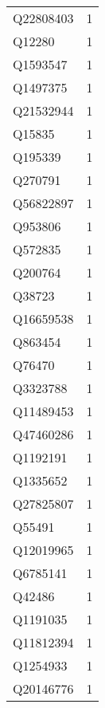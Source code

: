 \begin{tabular}{lr}
   Q22808403 &                             1 \\
      Q12280 &                             1 \\
    Q1593547 &                             1 \\
    Q1497375 &                             1 \\
   Q21532944 &                             1 \\
      Q15835 &                             1 \\
     Q195339 &                             1 \\
     Q270791 &                             1 \\
   Q56822897 &                             1 \\
     Q953806 &                             1 \\
     Q572835 &                             1 \\
     Q200764 &                             1 \\
      Q38723 &                             1 \\
   Q16659538 &                             1 \\
     Q863454 &                             1 \\
      Q76470 &                             1 \\
    Q3323788 &                             1 \\
   Q11489453 &                             1 \\
   Q47460286 &                             1 \\
    Q1192191 &                             1 \\
    Q1335652 &                             1 \\
   Q27825807 &                             1 \\
      Q55491 &                             1 \\
   Q12019965 &                             1 \\
    Q6785141 &                             1 \\
      Q42486 &                             1 \\
    Q1191035 &                             1 \\
   Q11812394 &                             1 \\
    Q1254933 &                             1 \\
   Q20146776 &                             1 \\

\end{tabular}
